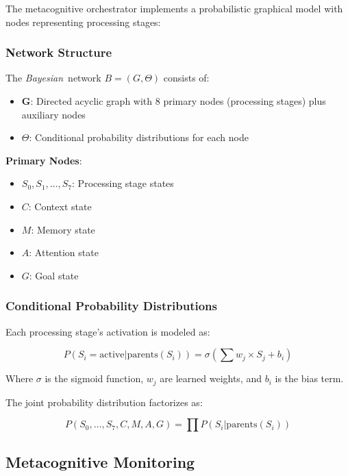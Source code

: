 \documentclass[11pt,a4paper]{article}
\newcommand{\bayesian}{\textit{Bayesian}}
\begin{document}
The metacognitive orchestrator implements a probabilistic graphical model with nodes representing processing stages:

\subsubsection{Network Structure}

The \bayesian\ network $B = (G, \Theta)$ consists of:
\begin{itemize}
\item \textbf{G}: Directed acyclic graph with 8 primary nodes (processing stages) plus auxiliary nodes
\item \textbf{$\Theta$}: Conditional probability distributions for each node
\end{itemize}

\textbf{Primary Nodes}:
\begin{itemize}
\item $S_0, S_1, \ldots, S_7$: Processing stage states
\item $C$: Context state
\item $M$: Memory state
\item $A$: Attention state
\item $G$: Goal state
\end{itemize}

\subsubsection{Conditional Probability Distributions}

Each processing stage's activation is modeled as:

\begin{equation}
P(S_i = \text{active} | \text{parents}(S_i)) = \sigma\left(\sum w_j \times S_j + b_i\right)
\end{equation}

Where $\sigma$ is the sigmoid function, $w_j$ are learned weights, and $b_i$ is the bias term.

The joint probability distribution factorizes as:

\begin{equation}
P(S_0,\ldots,S_7,C,M,A,G) = \prod P(S_i | \text{parents}(S_i))
\end{equation}

\subsection{Metacognitive Monitoring}
\end{document}
